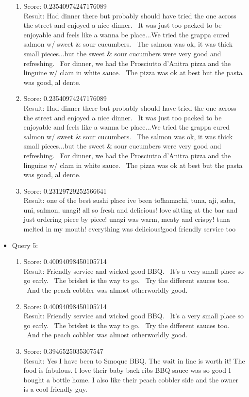 \documentclass[paper=a4, fontsize=11pt]{jhwhw} %
\begin{document}
\begin{itemize}
\begin{enumerate}
\item Score: 0.23540974247176089\\
Result: Had dinner there but probably should have tried the one across the street and enjoyed a nice dinner.  It was just too packed to be enjoyable and feels like a wanna be place...We tried the grappa cured salmon w/ sweet \& sour cucumbers.  The salmon was ok, it was thick small pieces...but the sweet \& sour cucumbers were very good and refreshing.  For dinner, we had the Prosciutto d'Anitra pizza and the linguine w/ clam in white sauce.  The pizza was ok at best but the pasta was good, al dente.
\item Score: 0.23540974247176089\\
Result: Had dinner there but probably should have tried the one across the street and enjoyed a nice dinner.  It was just too packed to be enjoyable and feels like a wanna be place...We tried the grappa cured salmon w/ sweet \& sour cucumbers.  The salmon was ok, it was thick small pieces...but the sweet \& sour cucumbers were very good and refreshing.  For dinner, we had the Prosciutto d'Anitra pizza and the linguine w/ clam in white sauce.  The pizza was ok at best but the pasta was good, al dente.
\item Score: 0.23129729252566641\\
Result: one of the best sushi place ive been to!hamachi, tuna, aji, saba, uni, salmon, unagi! all so fresh and delicious! love sitting at the bar and just ordering piece by piece! unagi was warm, meaty and crispy! tuna melted in my mouth! everything was delicious!good friendly service too
\end{enumerate}
\item Query 5:
\begin{enumerate}
\item Score: 0.40094098450105714\\
Result: Friendly service and wicked good BBQ.  It's a very small place so go early.  The brisket is the way to go.  Try the different sauces too.  And the peach cobbler was almost otherworldly good.
\item Score: 0.40094098450105714\\
Result: Friendly service and wicked good BBQ.  It's a very small place so go early.  The brisket is the way to go.  Try the different sauces too.  And the peach cobbler was almost otherworldly good.
\item Score: 0.3946525035307547\\
Result: Yes I have been to Smoque BBQ. The wait in line is worth it! The food is fabulous. I love their baby back ribs BBQ sauce was so good I bought a bottle home. I also like their peach cobbler side and the owner is a cool friendly guy.

\end{enumerate}
\end{itemize}
\end{document}
